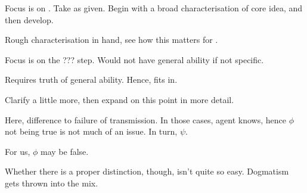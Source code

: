 \begin{note}
  Focus is on \nI{}.
  Take \nIm{} as given.
  Begin with a broad characterisation of core idea, and then develop.
\end{note}



\begin{note}
  Rough characterisation in hand, see how this matters for \AR{}.

  Focus is on the ??? step.
  Would not have general ability if not specific.

  Requires truth of general ability.
  Hence, fits in.

  Clarify a little more, then expand on this point in more detail.
\end{note}

\begin{note}
  Here, difference to failure of transmission.
  In those cases, agent knows, hence \(\phi\) not being true is not much of an issue.
  In turn, \(\psi\).

  For us, \(\phi\) may be false.

  Whether there is a proper distinction, though, isn't quite so easy.
  Dogmatism gets thrown into the mix.
\end{note}


